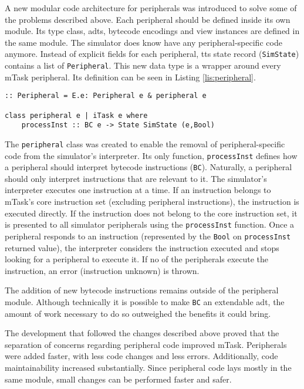 A new modular code architecture for peripherals was introduced to solve some of the problems described above. Each peripheral should be defined inside its own module. Its type class, \acsp{adt}, bytecode encodings and view instances are defined in the same module. The simulator does know have any peripheral-specific code anymore. Instead of explicit fields for each peripheral, tts state record (\texttt{SimState}) contains a list of \texttt{Peripheral}. This new data type is a wrapper around every \gls{mTask} peripheral. Its definition can be seen in Listing \ref{lis:peripheral}. 

\begin{lstlisting}[caption=The \texttt{Peripheral} class,captionpos=b,label=lis:peripheral]
:: Peripheral = E.e: Peripheral e & peripheral e

class peripheral e | iTask e where
	processInst :: BC e -> State SimState (e,Bool)
\end{lstlisting}

The \texttt{peripheral} class was created to enable the removal of peripheral-specific code from the simulator's interpreter. Its only function, \texttt{processInst} defines how a peripheral should interpret bytecode instructions (\texttt{BC}). Naturally, a peripheral should only interpret instructions that are relevant to it. The simulator's interpreter executes one instruction at a time. If an instruction belongs to \gls{mTask}'s core instruction set (excluding peripheral instructions), the instruction is executed directly. If the instruction does not belong to the core instruction set, it is presented to all simulator peripherals using the \texttt{processInst} function. Once a peripheral responds to an instruction (represented by the \texttt{Bool} on \texttt{processInst} returned value), the interpreter considers the instruction executed and stops looking for a peripheral to execute it. If no of the peripherals execute the instruction, an error (instruction unknown) is thrown. 

The addition of new bytecode instructions remains outside of the peripheral module. Although technically it is possible to make \texttt{BC} an extendable \acs{adt}, the amount of work necessary to do so outweighed the benefits it could bring. 

The development that followed the changes described above proved that the separation of concerns regarding peripheral code improved \gls{mTask}. Peripherals were added faster, with less code changes and less errors. Additionally, code maintainability increased substantially. Since peripheral code lays mostly in the same module, small changes can be performed faster and safer.

